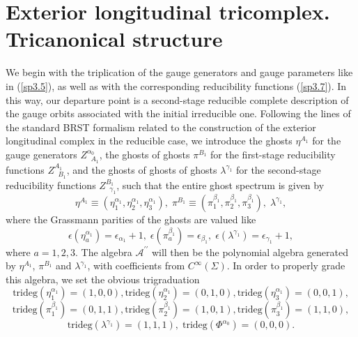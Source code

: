 \documentclass[a4paper,12pt]{article}
\begin{document}
\section{Exterior longitudinal tricomplex. Tricanonical structure}

We begin with the triplication of the gauge generators and gauge parameters
like in (\ref{sp3.5}), as well as with the corresponding reducibility
functions (\ref{sp3.7}). In this way, our departure point is a second-stage
reducible complete description of the gauge orbits associated with the
initial irreducible one. Following the lines of the standard BRST formalism
related to the construction of the exterior longitudinal complex in the
reducible case, we introduce the ghosts $\eta ^{A_{1}}$ for the gauge
generators $Z_{\;\;A_{1}}^{\alpha _{0}}$, the ghosts of ghosts $\pi ^{B_{1}}$
for the first-stage reducibility functions $Z_{\;\;B_{1}}^{A_{1}}$, and the
ghosts of ghosts of ghosts $\lambda ^{\gamma _{1}}$ for the second-stage
reducibility functions $Z_{\;\;\gamma _{1}}^{B_{1}}$, such that the entire
ghost spectrum is given by 
\begin{equation}
\eta ^{A_{1}}\equiv \left( \eta _{1}^{\alpha _{1}},\eta _{2}^{\alpha
_{1}},\eta _{3}^{\alpha _{1}}\right) ,\;\pi ^{B_{1}}\equiv \left( \pi
_{1}^{\beta _{1}},\pi _{2}^{\beta _{1}},\pi _{3}^{\beta _{1}}\right)
,\;\lambda ^{\gamma _{1}},  \label{sp3.11}
\end{equation}
where the Grassmann parities of the ghosts are valued like 
\begin{equation}
\epsilon \left( \eta _{a}^{\alpha _{1}}\right) =\epsilon _{\alpha
_{1}}+1,\;\epsilon \left( \pi _{a}^{\beta _{1}}\right) =\epsilon _{\beta
_{1}},\;\epsilon \left( \lambda ^{\gamma _{1}}\right) =\epsilon _{\gamma
_{1}}+1,  \label{sp3.11a}
\end{equation}
where $a=1,2,3$. The algebra $\mathcal{A}^{\prime \prime }$ will then be the
polynomial algebra generated by $\eta ^{A_{1}}$, $\pi ^{B_{1}}$ and $\lambda
^{\gamma _{1}}$, with coefficients from $C^{\infty }\left( \Sigma \right) $.
In order to properly grade this algebra, we set the obvious trigraduation 
\begin{equation}
\mathrm{trideg}\left( \eta _{1}^{\alpha _{1}}\right) =\left( 1,0,0\right) ,%
\mathrm{trideg}\left( \eta _{2}^{\alpha _{1}}\right) =\left( 0,1,0\right) ,%
\mathrm{trideg}\left( \eta _{3}^{\alpha _{1}}\right) =\left( 0,0,1\right) ,
\label{sp3.12}
\end{equation}
\begin{equation}
\mathrm{trideg}\left( \pi _{1}^{\beta _{1}}\right) =\left( 0,1,1\right) ,%
\mathrm{trideg}\left( \pi _{2}^{\beta _{1}}\right) =\left( 1,0,1\right) ,%
\mathrm{trideg}\left( \pi _{3}^{\beta _{1}}\right) =\left( 1,1,0\right) ,
\label{sp3.13}
\end{equation}
\begin{equation}
\mathrm{trideg}\left( \lambda ^{\gamma _{1}}\right) =\left( 1,1,1\right) ,\;%
\mathrm{trideg}\left( \Phi ^{\alpha _{0}}\right) =\left( 0,0,0\right) .
\label{sp3.14}
\end{equation}
\end{document}
